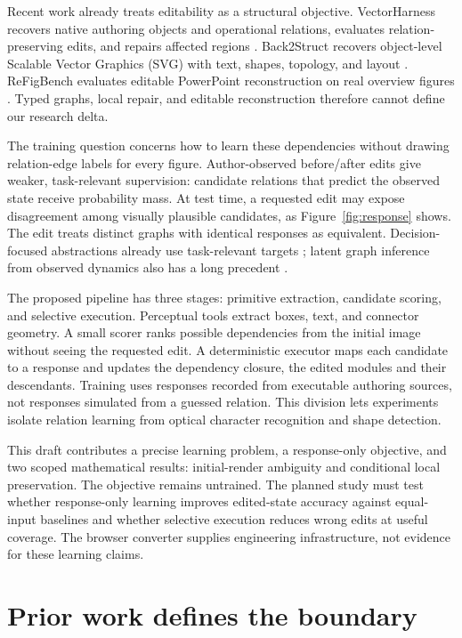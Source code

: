 \documentclass{article}
\begin{document}
Recent work already treats editability as a structural objective. VectorHarness recovers native authoring objects and operational relations, evaluates relation-preserving edits, and repairs affected regions \citep{tang2026vectorharness}. Back2Struct recovers object-level Scalable Vector Graphics (SVG) with text, shapes, topology, and layout \citep{yan2026back2struct}. ReFigBench evaluates editable PowerPoint reconstruction on real overview figures \citep{fan2026refigbench}. Typed graphs, local repair, and editable reconstruction therefore cannot define our research delta.

The training question concerns how to learn these dependencies without drawing relation-edge labels for every figure. Author-observed before/after edits give weaker, task-relevant supervision: candidate relations that predict the observed state receive probability mass. At test time, a requested edit may expose disagreement among visually plausible candidates, as Figure~\ref{fig:response} shows. The edit treats distinct graphs with identical responses as equivalent. Decision-focused abstractions already use task-relevant targets \citep{poli2023ideal}; latent graph inference from observed dynamics also has a long precedent \citep{kipf2018nri}.

The proposed pipeline has three stages: primitive extraction, candidate scoring, and selective execution. Perceptual tools extract boxes, text, and connector geometry. A small scorer ranks possible dependencies from the initial image without seeing the requested edit. A deterministic executor maps each candidate to a response and updates the dependency closure, the edited modules and their descendants. Training uses responses recorded from executable authoring sources, not responses simulated from a guessed relation. This division lets experiments isolate relation learning from optical character recognition and shape detection.

This draft contributes a precise learning problem, a response-only objective, and two scoped mathematical results: initial-render ambiguity and conditional local preservation. The objective remains untrained. The planned study must test whether response-only learning improves edited-state accuracy against equal-input baselines and whether selective execution reduces wrong edits at useful coverage. The browser converter supplies engineering infrastructure, not evidence for these learning claims.

\section{Prior work defines the boundary}
\end{document}
